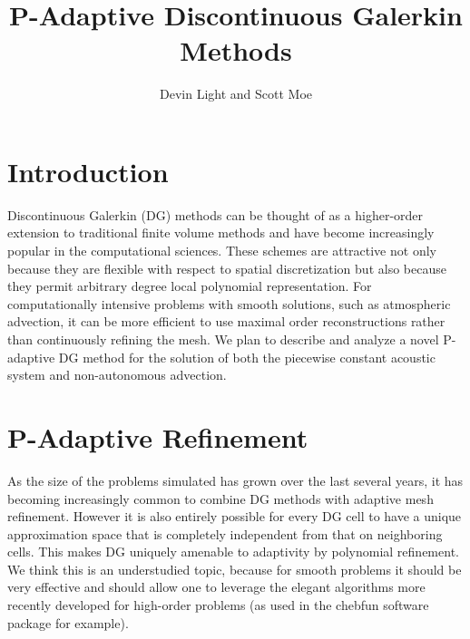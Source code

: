 \documentclass[10]{amsart}
\title[]{P-Adaptive Discontinuous Galerkin Methods}
\author{Devin Light and Scott Moe}
\begin{document}
\maketitle

\section{Introduction}
Discontinuous Galerkin (DG) methods can be thought of as a higher-order extension to traditional finite volume methods and have become increasingly popular in the computational sciences. These schemes are attractive not only because they are flexible with respect to spatial discretization but also because they permit arbitrary degree local polynomial representation. For computationally intensive problems with smooth solutions, such as atmospheric advection, it can be more efficient to use maximal order reconstructions rather than continuously refining the mesh. We plan to describe and analyze a novel P-adaptive DG method for the solution of both the piecewise constant acoustic system and non-autonomous advection. 

\section{P-Adaptive Refinement}
As the size of the problems simulated has grown over the last several years, it has becoming increasingly common to combine DG methods with adaptive mesh refinement. However it is also entirely possible for every DG cell to have a unique approximation space that is completely independent from
that on neighboring cells. This makes DG uniquely amenable to adaptivity by polynomial refinement. We think this is an understudied topic, because for smooth problems it should be very effective \cite{fankhauser2014hp} and should allow one to leverage
the elegant algorithms more recently developed for high-order problems (as used in the chebfun software package for example).
\end{document}
